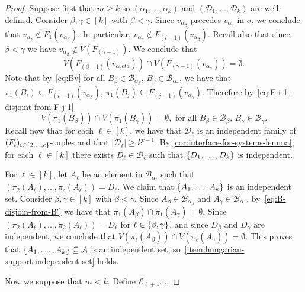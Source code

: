 \documentclass{patmorin}
\DeclarePairedDelimiter\set{\{}{\}}
\begin{document}
\begin{proof}
Suppose first that $m\geq k$ so $(\alpha_1,\ldots,\alpha_k)$ and $(\mathcal{D}_1,\ldots,\mathcal{D}_k)$ are well-defined. 
Consider $\beta,\gamma\in[k]$ with $\beta<\gamma$.
Since $v_{\alpha_\beta}$ precedes $v_{\alpha_\gamma}$ in $\sigma$, we conclude that
$v_{\alpha_\gamma} \not\in F_1(v_{\alpha_\beta})$. 
In particular, $v_{\alpha_\gamma} \not\in F_{(i-1)}(v_{\alpha_\beta})$. 
Recall also that since $\beta<\gamma$ we have $v_{\alpha_\beta}\not\in V(F_{(\gamma-1)})$. 
We conclude that 
\begin{equation}
V(F_{(\beta-1)}(v_{\alpha_beta})) \cap V(F_{(\gamma-1)}(v_{\alpha_\gamma})) = \emptyset.
\label{eq:F-i-1-disjoint-from-F-j-1}
\end{equation}
Note that by~\eqref{eq:Bv} for all $B_\beta\in \mathcal{B}_{\alpha_\beta}$, $B_\gamma\in\mathcal{B}_{\alpha_\gamma}$, we have that 
$\pi_1(B_i)\subseteq F_{(i-1)}(v_{\alpha_\beta})$,  $\pi_1(B_j)\subseteq F_{(j-1)}(v_{\alpha_\gamma})$. 
Therefore by~\eqref{eq:F-i-1-disjoint-from-F-j-1}
\begin{equation}
V(\pi_1(B_\beta)) \cap V(\pi_1(B_\gamma))=\emptyset, \textrm{ for all $B_\beta\in\mathcal{B}_\beta$, $B_\gamma\in\mathcal{B}_\gamma$.}
\label{eq:B-disjoin-from-B'}
\end{equation}
Recall now that for each $\ell\in[k]$, 
we have that $\mathcal{D}_\ell$ is an independent family of 
$(F_i)_{i\in\set{2,\ldots,c}}$-tuples and that 
$|\mathcal{D}_{\ell}|\geq k^{c-1}$. 
By \cref{cor:interface-for-systems-lemma}, for each $\ell\in[k]$ there exists $D_\ell\in\mathcal{D}_\ell$ such that $\set{D_1,\ldots,D_k}$ is independent. 

For $\ell\in[k]$, let $A_{\ell}$ be an element in $\mathcal{B}_{\alpha_\ell}$ such that
$(\pi_2(A_\ell),\ldots,\pi_c(A_\ell))=D_\ell$. 
We claim that $\set{A_1,\ldots,A_k}$ is an independent set. 
Consider $\beta,\gamma\in[k]$ with $\beta<\gamma$. 
Since $A_\beta\in\mathcal{B}_{\alpha_\beta}$ and $A_\gamma\in\mathcal{B}_{\alpha_\gamma}$, by~\cref{eq:B-disjoin-from-B'} we have that $\pi_1(A_\beta)\cap \pi_1(A_\gamma)=\emptyset$. 
Since $(\pi_2(A_{\ell}),\ldots,\pi_2(A_{\ell}))=D_{\ell}$ for $\ell\in\set{\beta,\gamma}$, and since $D_\beta$ and $D_\gamma$ are independent, we conclude that
$V(\pi_\ell(A_\beta)) \cap V(\pi_\ell(A_\gamma))=\emptyset$. 
This proves that $\set{A_1,\ldots,A_k}\subseteq\mathcal{A}$ is an independent set, so~\eqref{item:hungarian-support:independent-set} holds.

Now we suppose that $m<k$.   Define $\mathcal{E}_{\ell+1}$....



\end{proof}
\end{document}
